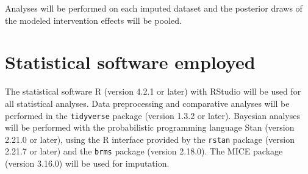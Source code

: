 \documentclass{article}
\begin{document}
Analyses will be performed on each imputed dataset and the posterior draws of the modeled intervention effects will be pooled.   

\section{Statistical software employed}

The statistical software R (version 4.2.1 or later) with RStudio will be used for all statistical analyses. Data preprocessing and comparative analyses will be performed in the \texttt{tidyverse} package (version 1.3.2 or later). Bayesian analyses will be performed with the probabilistic programming language Stan (version 2.21.0 or later), using the R interface provided by the \texttt{rstan} package (version 2.21.7 or later) and the \texttt{brms} package (version 2.18.0). The MICE package (version 3.16.0) will be used for imputation.



\end{document}
